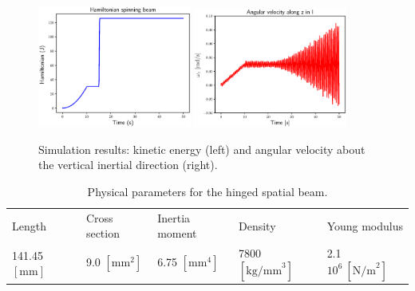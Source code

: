 \documentclass{svjour3}                     %
\begin{document}
\begin{figure}[tb]
	\centering
	\includegraphics[width=0.45\textwidth]{H_3Dbeam.eps} 
	\includegraphics[width=0.45\textwidth]{omega_zI.eps} 
	\caption{Simulation results: kinetic energy (left) and angular velocity about the vertical inertial direction (right).}
	\label{fig:H_omega}
\end{figure}

\begin{table}[tb]
	\caption{Physical parameters for the hinged spatial beam.}
	\label{tab:data_3Dbeam}       %
	\begin{tabular}{lllll}
		\hline\noalign{\smallskip}
		Length & Cross section & Inertia moment & Density & Young modulus \\
		\noalign{\smallskip}\hline\noalign{\smallskip}
		141.45 $[\mathrm{mm}]$ & 9.0 $[\mathrm{mm}^2]$ & 6.75 $[\mathrm{mm}^4]$ & 7800 $[\mathrm{kg/mm}^3]$ & 2.1 $10^6 \ [\mathrm{N/m}^2]$  \\
		\hline
	\end{tabular}
\end{table}
\end{document}
